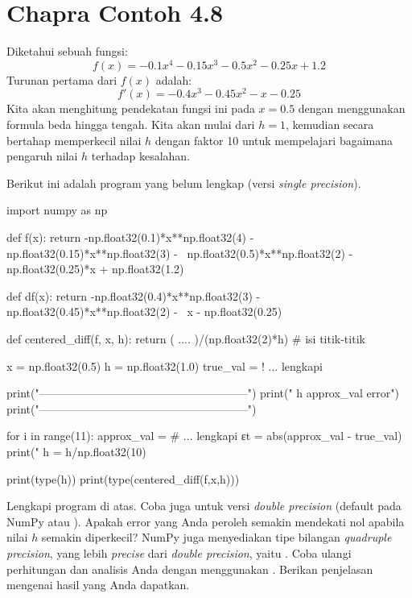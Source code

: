 \section{Chapra Contoh 4.8}
Diketahui sebuah fungsi:
\begin{equation}
f(x) = -0.1x^4 - 0.15x^3 - 0.5x^2 - 0.25x + 1.2
\end{equation}
Turunan pertama dari $f(x)$ adalah:
\begin{equation}
f'(x) = -0.4x^3 - 0.45x^2 - x - 0.25
\end{equation}
Kita akan menghitung pendekatan fungsi ini pada $x=0.5$ dengan menggunakan
formula beda hingga tengah. Kita akan mulai dari $h=1$, kemudian secara bertahap
memperkecil nilai $h$ dengan faktor 10 untuk mempelajari bagaimana
pengaruh nilai $h$ terhadap kesalahan.

Berikut ini adalah program yang belum lengkap (versi \textit{single precision}).
\begin{pythoncode}
import numpy as np
  
def f(x):
  return -np.float32(0.1)*x**np.float32(4) - np.float32(0.15)*x**np.float32(3) - \
  np.float32(0.5)*x**np.float32(2) - np.float32(0.25)*x + np.float32(1.2)
    
def df(x):
  return -np.float32(0.4)*x**np.float32(3) - np.float32(0.45)*x**np.float32(2) - \
  x - np.float32(0.25)
    
def centered_diff(f, x, h):
  return ( .... )/(np.float32(2)*h) # isi titik-titik
  
  x = np.float32(0.5)
  h = np.float32(1.0)
  true_val = ! ... lengkapi
  
  print("--------------------------------------------------------")
  print("           h             approx_val             error")
  print("--------------------------------------------------------")
    
for i in range(11):
  approx_val = # ... lengkapi
  εt = abs(approx_val - true_val)
  print("%
  h = h/np.float32(10)

print(type(h))
print(type(centered_diff(f,x,h)))  
\end{pythoncode}

\begin{soal}
Lengkapi program di atas.
Coba juga untuk versi \textit{double precision} (default pada NumPy
atau ).
Apakah error yang Anda peroleh semakin mendekati nol apabila nilai $h$ semakin
diperkecil?
NumPy juga menyediakan tipe bilangan \textit{quadruple precision}, yang lebih
\textit{precise} dari \textit{double precision}, yaitu
. Coba ulangi perhitungan dan analisis Anda dengan
menggunakan \txtinline{np.float128}.
Berikan penjelasan mengenai hasil yang Anda dapatkan.
\end{soal}